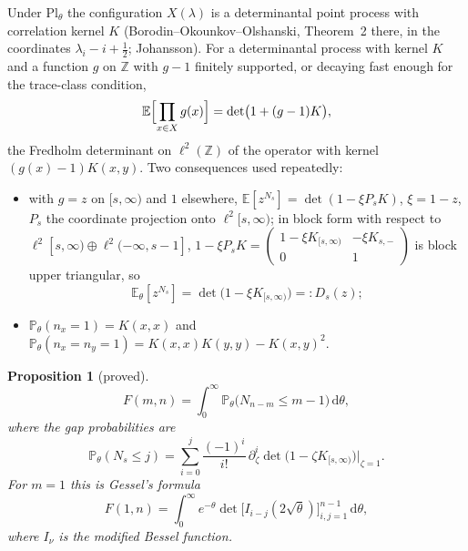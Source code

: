 \documentclass[11pt]{article}
\newtheorem{proposition}[theorem]{Proposition}
\theoremstyle{definition}
\theoremstyle{remark}
\newcommand{\Z}{\mathbb{Z}}
\newcommand{\E}{\mathbb{E}}
\newcommand{\Prob}{\mathbb{P}}
\newcommand{\Pl}{\mathrm{Pl}}
\newcommand{\dd}{\,\mathrm{d}}
\begin{document}
Under $\Pl_\theta$ the configuration $X(\lambda)$ is a determinantal point process with correlation kernel $K$ (Borodin--Okounkov--Olshanski, Theorem~2 there, in the coordinates $\lambda_i-i+\frac12$; Johansson). For a determinantal process with kernel $K$ and a function $g$ on $\Z$ with $g-1$ finitely supported, or decaying fast enough for the trace-class condition,
\begin{equation}\label{eq:multfunc}
\E\Bigl[\prod_{x\in X}g(x)\Bigr]=\det\bigl(1+(g-1)K\bigr),
\end{equation}
the Fredholm determinant on $\ell^2(\Z)$ of the operator with kernel $(g(x)-1)K(x,y)$. Two consequences used repeatedly:
\begin{itemize}
\item with $g=z$ on $[s,\infty)$ and $1$ elsewhere, $\E[z^{N_s}]=\det(1-\xi P_sK)$, $\xi=1-z$, $P_s$ the coordinate projection onto $\ell^2[s,\infty)$; in block form with respect to $\ell^2[s,\infty)\oplus\ell^2(-\infty,s-1]$, $1-\xi P_sK=\begin{pmatrix}1-\xi K_{[s,\infty)}&-\xi K_{s,-}\\0&1\end{pmatrix}$ is block upper triangular, so
\begin{equation}\label{eq:Ds}
\E_\theta[z^{N_s}]=\det\bigl(1-\xi K_{[s,\infty)}\bigr)=:D_s(z);
\end{equation}
\item $\Prob_\theta(n_x=1)=K(x,x)$ and $\Prob_\theta(n_x=n_y=1)=K(x,x)K(y,y)-K(x,y)^2$.
\end{itemize}

\begin{proposition}[proved]\label{prop:fredholm}
\begin{equation}\label{eq:Fint}
F(m,n)=\int_0^\infty\Prob_\theta\bigl(N_{n-m}\le m-1\bigr)\dd\theta,
\end{equation}
where the gap probabilities are
\begin{equation}\label{eq:gap}
\Prob_\theta(N_s\le j)=\sum_{i=0}^{j}\frac{(-1)^i}{i!}\,\partial_\zeta^i\det\bigl(1-\zeta K_{[s,\infty)}\bigr)\Big|_{\zeta=1}.
\end{equation}
For $m=1$ this is Gessel's formula
\begin{equation}\label{eq:gessel}
F(1,n)=\int_0^\infty e^{-\theta}\det\bigl[I_{i-j}(2\sqrt\theta)\bigr]_{i,j=1}^{n-1}\dd\theta ,
\end{equation}
where $I_\nu$ is the modified Bessel function.
\end{proposition}
\end{document}
